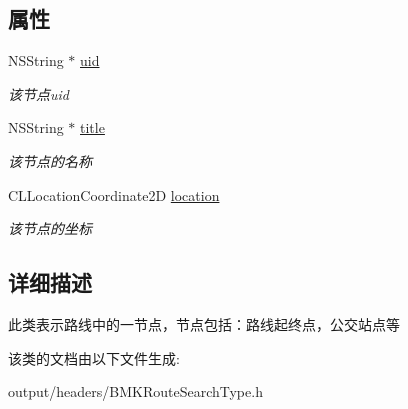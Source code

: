 \subsection*{属性}
\begin{DoxyCompactItemize}
\item 
\hypertarget{interface_b_m_k_route_node_aaa2aba77525dedcf747e2b3073d0b178}{}N\+S\+String $\ast$ \hyperlink{interface_b_m_k_route_node_aaa2aba77525dedcf747e2b3073d0b178}{uid}\label{interface_b_m_k_route_node_aaa2aba77525dedcf747e2b3073d0b178}

\begin{DoxyCompactList}\small\item\em 该节点uid \end{DoxyCompactList}\item 
\hypertarget{interface_b_m_k_route_node_a911fa36be5587e1bd9abb6bd9c4e6c2b}{}N\+S\+String $\ast$ \hyperlink{interface_b_m_k_route_node_a911fa36be5587e1bd9abb6bd9c4e6c2b}{title}\label{interface_b_m_k_route_node_a911fa36be5587e1bd9abb6bd9c4e6c2b}

\begin{DoxyCompactList}\small\item\em 该节点的名称 \end{DoxyCompactList}\item 
\hypertarget{interface_b_m_k_route_node_a4e3c2a31a2293b6f600f3b4f9a52a722}{}C\+L\+Location\+Coordinate2\+D \hyperlink{interface_b_m_k_route_node_a4e3c2a31a2293b6f600f3b4f9a52a722}{location}\label{interface_b_m_k_route_node_a4e3c2a31a2293b6f600f3b4f9a52a722}

\begin{DoxyCompactList}\small\item\em 该节点的坐标 \end{DoxyCompactList}\end{DoxyCompactItemize}


\subsection{详细描述}
此类表示路线中的一节点，节点包括：路线起终点，公交站点等 

该类的文档由以下文件生成\+:\begin{DoxyCompactItemize}
\item 
output/headers/B\+M\+K\+Route\+Search\+Type.\+h\end{DoxyCompactItemize}

